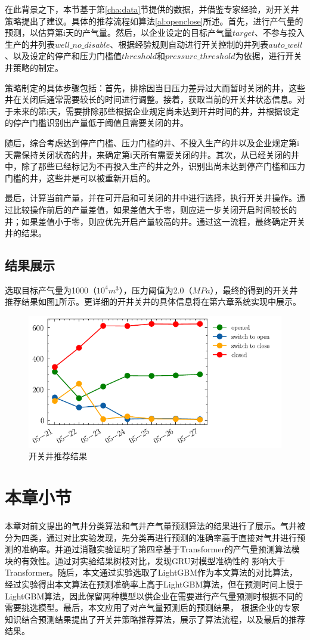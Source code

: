 在此背景之下，本节基于第\ref{cha:data}节提供的数据，并借鉴专家经验，对开关井策略提出了建议。具体的推荐流程如算法\ref{al:openclose}所述。首先，进行产气量的预测，以估算第i天的产气量。然后，以企业设定的目标产气量$target$、不参与投入生产的井列表$well\_no\_disable$、根据经验规则自动进行开关控制的井列表$auto\_well$、以及设定的停产和压力门槛值$threshold$和$pressure\_threshold$为依据，进行开关井策略的制定。

策略制定的具体步骤包括：首先，排除因当日压力差异过大而暂时关闭的井，这些井在关闭后通常需要较长的时间进行调整。接着，获取当前的开关井状态信息。对于未来的第i天，需要排除那些根据企业规定尚未达到开井时间的井，并根据设定的停产门槛识别出产量低于阈值且需要关闭的井。

随后，综合考虑达到停产门槛、压力门槛的井、不投入生产的井以及企业规定第i天需保持关闭状态的井，来确定第i天所有需要关闭的井。其次，从已经关闭的井中，除了那些已经标记为不再投入生产的井之外，识别出尚未达到停产门槛和压力门槛的井，这些井是可以被重新开启的。

最后，计算当前产量，并在可开启和可关闭的井中进行选择，执行开关井操作。通过比较操作前后的产量差值，如果差值大于零，则应进一步关闭开启时间较长的井；如果差值小于零，则应优先开启产量较高的井。通过这一流程，最终确定开关井的结果。

\subsection{结果展示}
选取目标产气量为1000（$10^4m^3$），压力阈值为2.0（$MPa$），最终的得到的开关井推荐结果如图\ref{fig:openclosereco}所示。更详细的开井关井的具体信息将在第六章系统实现中展示。
\begin{figure}[H]
    \centering
    \includegraphics[width=.8\linewidth]{figure/reco.pdf}
    \caption{开关井推荐结果}
    \label{fig:openclosereco}
\end{figure}

  \section{本章小节}
  本章对前文提出的气井分类算法和气井产气量预测算法的结果进行了展示。气井被分为四类，通过对比实验发现，先分类再进行预测的准确率高于直接对气井进行预测的准确率。并通过消融实验证明了第四章基于Transformer的产气量预测算法模块的有效性。通过对实验结果树枝对比，发现GRU对模型准确性的
  影响大于Transformer。随后，本文通过实验选取了LightGBM作为本文算法的对比算法，经过实验得出本文算法在预测准确率上高于LightGBM算法，但在预测时间上慢于LightGBM算法，因此保留两种模型以供企业在需要进行产气量预测时根据不同的需要挑选模型。最后，本文应用了对产气量预测后的预测结果，
  根据企业的专家知识结合预测结果提出了开关井策略推荐算法，展示了算法流程，以及最后的推荐结果。